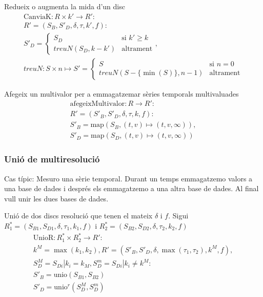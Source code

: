 Redueix o augmenta la mida d'un disc
  \begin{gather*}
    \text{CanviaK}: R \times k' \longrightarrow R': \\
    R' = (S_B,S'_D,\delta,\tau,k',f) : \\
    S'_D = \begin{cases}
      S_D         & \text{si } k' \geq k   \\
      treuN(S_D,k-k')    & \text{altrament}
    \end{cases}, \\
    treuN: S \times n \mapsto S'=  
    \begin{cases}
      S                & \text{si } n=0   \\
      treuN(S - \{\min(S)\},n-1)  & \text{altrament}
    \end{cases}
\end{gather*}


Afegeix un multivalor per a emmagatzemar sèries temporals multivaluades
  \begin{gather*}
    \text{afegeixMultivalor}: R \longrightarrow R': \\
    R' = (S'_{B},S'_{D},\delta,\tau,k,f): \\
    S'_{B} = \text{map}(S_B,(t,v)\mapsto(t,v,\infty)), \\
    S'_{D} = \text{map}(S_D,(t,v)\mapsto(t,v,\infty))
  \end{gather*}





\subsubsection{Unió de multiresolució}

Cas típic:
Mesuro una sèrie temporal. Durant un temps emmagatzemo valors a una
base de dades i després els emmagatzemo a una altra base de dades. Al final vull unir les dues bases de dades.


Unió de dos discs resolució que tenen el mateix $\delta$ i $f$.
Sigui $R_1^*=(S_{B1},S_{D1},\delta,\tau_1,k_1,f)$ i
$R_2^*=(S_{B2},S_{D2},\delta,\tau_2,k_2,f)$
  \begin{gather*}
    \text{UnioR}: R_1^* \times R_2^* \longrightarrow R': \\
    k^M=\max(k_1,k_2), R' = (S'_B,S'_D,\delta,\max(\tau_1,\tau_2),k^M,f), \\
    S^M_D = S_{Di} | k_i = k_M,  S^m_D = S_{Di} | k_i \neq k^M   : \\
    S'_B = \text{unio}(S_{B1},S_{B2})\\
    S'_D = \text{unio}^r(S^M_{D},S^m_{D})
\end{gather*} 




